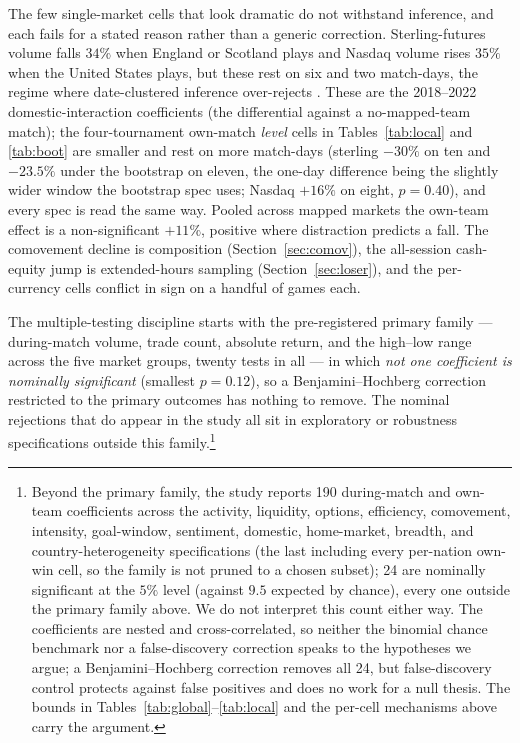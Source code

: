 \documentclass[12pt]{article}
\begin{document}
The few single-market cells that look dramatic do not withstand inference, and each fails for a stated reason rather than a generic correction. Sterling-futures volume falls $34\%$ when England or Scotland plays and Nasdaq volume rises $35\%$ when the United States plays, but these rest on six and two match-days, the regime where date-clustered inference over-rejects \cite{cameron2008}. These are the 2018--2022 domestic-interaction coefficients (the differential against a no-mapped-team match); the four-tournament own-match \emph{level} cells in Tables~\ref{tab:local} and \ref{tab:boot} are smaller and rest on more match-days (sterling $-30\%$ on ten and $-23.5\%$ under the bootstrap on eleven, the one-day difference being the slightly wider window the bootstrap spec uses; Nasdaq $+16\%$ on eight, $p=0.40$), and every spec is read the same way. Pooled across mapped markets the own-team effect is a non-significant $+11\%$, positive where distraction predicts a fall. The comovement decline is composition (Section~\ref{sec:comov}), the all-session cash-equity jump is extended-hours sampling (Section~\ref{sec:loser}), and the per-currency cells conflict in sign on a handful of games each.

The multiple-testing discipline starts with the pre-registered primary family --- during-match volume, trade count, absolute return, and the high--low range across the five market groups, twenty tests in all --- in which \emph{not one coefficient is nominally significant} (smallest $p=0.12$), so a Benjamini--Hochberg correction restricted to the primary outcomes has nothing to remove. The nominal rejections that do appear in the study all sit in exploratory or robustness specifications outside this family.\footnote{Beyond the primary family, the study reports 190 during-match and own-team coefficients across the activity, liquidity, options, efficiency, comovement, intensity, goal-window, sentiment, domestic, home-market, breadth, and country-heterogeneity specifications (the last including every per-nation own-win cell, so the family is not pruned to a chosen subset); 24 are nominally significant at the $5\%$ level (against $9.5$ expected by chance), every one outside the primary family above. We do not interpret this count either way. The coefficients are nested and cross-correlated, so neither the binomial chance benchmark nor a false-discovery correction speaks to the hypotheses we argue; a Benjamini--Hochberg correction \cite{benjamini1995} removes all 24, but false-discovery control protects against false positives and does no work for a null thesis. The bounds in Tables~\ref{tab:global}--\ref{tab:local} and the per-cell mechanisms above carry the argument.}
\end{document}
